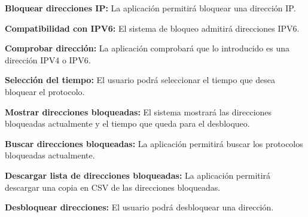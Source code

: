 \begin{functional}
        \item \textbf{Bloquear direcciones IP:} La aplicación permitirá bloquear una dirección IP.
        \begin{functional}
        \item \textbf{Compatibilidad con IPV6:} El sistema de bloqueo admitirá direcciones IPV6.
        \item \textbf{Comprobar dirección:} La aplicación comprobará que lo introducido es una dirección IPV4 o IPV6.
        \item \textbf{Selección del tiempo:} El usuario podrá seleccionar el tiempo que desea bloquear el protocolo.
        \item \textbf{Mostrar direcciones bloqueadas:} El sistema mostrará las direcciones bloqueadas actualmente y el tiempo que queda para el desbloqueo.
        \item \textbf{Buscar direcciones bloqueadas:} La aplicación permitirá buscar los protocolos bloqueadas actualmente.
        \item \textbf{Descargar lista de direcciones bloqueadas:} La aplicación permitirá descargar una copia en CSV de las direcciones bloqueadas.
        \item \textbf{Desbloquear direcciones:} El usuario podrá desbloquear una dirección.
        \end{functional}
\end{functional}


